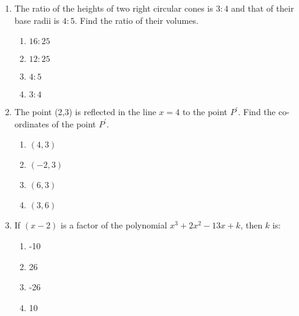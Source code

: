 \begin{enumerate}[label=(\roman*)]
    \item The ratio of the heights of two right circular cones is $3:4$ and that 
        of their base radii is $4:5$. Find the ratio of their volumes.

        \begin{multicols}{2}
        \begin{enumerate}[label=(\alph*)]
            \item $16:25$ 
            \item $12:25$ 
            \item $4:5$ 
            \item $3:4$ 
        \end{enumerate}
        \end{multicols}

    \item The point (2,3) is reflected in the line $x=4$ to the point $P^\prime$.
        Find the co-ordinates of the point $P^\prime$.

        \begin{multicols}{2}
        \begin{enumerate}[label=(\alph*)]
            \item $(4,3)$
            \item $(-2,3)$
            \item $(6,3)$ 
            \item $(3,6)$ 
        \end{enumerate}
        \end{multicols}

    \item If $(x-2)$ is a factor of the polynomial $x^3 + 2x^2 - 13x + k$, 
        then $k$ is:

        \begin{multicols}{2}
        \begin{enumerate}[label=(\alph*)]
            \item -10
            \item 26
            \item -26
            \item 10
        \end{enumerate}
        \end{multicols}


\end{enumerate}
